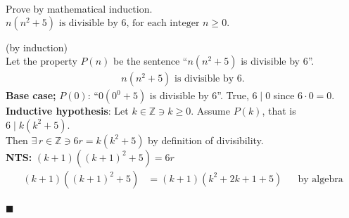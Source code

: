 \documentclass[12pt]{article}
\makeatletter
\newcommand{\Z}{\mathbb{Z}}
\renewcommand{\qed}{\hfill$\blacksquare$}
\renewenvironment{proof}{\begin{addmargin}[1em]{0em}\begin{newproof}}{\end{newproof}\end{addmargin}\qed}
\newenvironment{problem}[2][Problem]{\begin{trivlist}
    \item[\hskip \labelsep {\bfseries #1}\hskip \labelsep {\bfseries #2.}]}{\end{trivlist}}
\newcommand{\leqnomode}{\tagsleft@true\let\veqno\@@leqno}
\makeatother
\begin{document}



\begin{tcolorbox}[width=\textwidth,title={Problem 15},outer arc=0mm]
	Prove by mathematical induction. \\
	$n(n^{2}+5)\text{ is divisible by 6, for each integer } n \ge 0.$
	\newline
	\begin{proof}(by induction) \\
		Let the property $P(n)$ be the sentence ``$n(n^{2}+5)$ is divisible by 6''.
		\leqnomode
		\begin{align}
			\tag*{$P(n)\longrightarrow$} n(n^{2}+5)\text{ is divisible by 6}.
		\end{align}
		\textbf{Base case;} $P(0)$: ``$0(0^{0}+5)$ is divisible by 6''. True, $6 \mid 0$ since $6 \cdot 0 = 0$. \\
		\textbf{Inductive hypothesis}: Let $k \in \Z \ni k \ge 0$. Assume $P(k)$, that is $6 \mid k(k^{2}+5)$. \\
		Then $\exists \, r \in \Z \ni 6r = k(k^{2}+5)$ by definition of divisibility. \\
		\lbrack \textbf{NTS:} $(k+1)((k+1)^{2}+5) = 6r$\rbrack \
		\begin{align*}
			(k+1)((k+1)^{2}+5) &= (k+1)(k^{2} + 2k + 1 +5) && \text{by algebra}\\
		\end{align*}
	\end{proof}
\end{tcolorbox}

\end{document}
